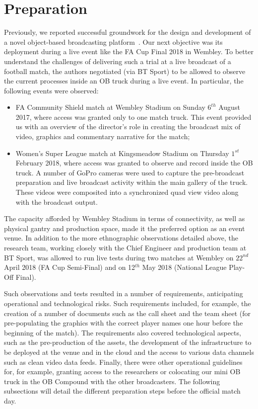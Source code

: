 \documentclass[sigchi-a, authorversion]{acmart}
\begin{document}
\section{Preparation}
Previously, we reported successful groundwork for the design and development
of a novel object-based broadcasting platform~\cite{kegel2017, Li:2018_CHI, Li:2018_TVX}.
Our next objective was its deployment during a live event like the FA Cup Final
2018 in Wembley. To better understand the challenges of delivering such a trial at
a live broadcast of a football match, the authors negotiated (via BT Sport) to be allowed
to observe the current processes inside an OB truck during a live event. In
particular, the following events were observed:

\begin{itemize}
  \item FA Community Shield match at Wembley Stadium on Sunday $6^{th}$ August 2017,
        where access was granted only to one match truck. This event provided us
        with an overview of the director's role in creating the broadcast mix of
        video, graphics and commentary narrative for the match;
  \item Women's Super League match at Kingsmeadow Stadium on Thursday $1^{st}$
        February 2018, where access was granted to observe and record inside the OB
        truck. A number of GoPro cameras were used to capture the pre-broadcast
        preparation and live broadcast activity within the main gallery of the
        truck. These videos were composited into a synchronized quad view video
        along with the broadcast output.
\end{itemize}

The capacity afforded by Wembley Stadium in terms of connectivity,
as well as physical gantry and production space, made it the preferred option as
an event venue. In addition to the more ethnographic observations detailed above,
the research team, working closely with the Chief Engineer and production team
at BT Sport, was allowed to run live tests during two matches at Wembley on $22^{nd}$
April 2018 (FA Cup Semi-Final) and on 12$^{th}$ May 2018 (National League Play-Off Final).

Such observations and tests resulted in a number of requirements, anticipating
operational and technological risks. Such requirements included, for example,
the creation of a number of documents such as the call sheet and the team sheet
(for pre-populating the graphics with the correct player names one hour before
the beginning of the match). The requirements also covered technological
aspects, such as the pre-production of the assets, the development of the
infrastructure to be deployed at the venue and in the cloud and the access to
various data channels such as clean video data feeds. Finally, there were
other operational guidelines for, for example, granting access to the researchers
or colocating our mini OB truck in the OB Compound with the other broadcasters.
The following subsections will detail the different preparation steps before the
official match day.
\end{document}
